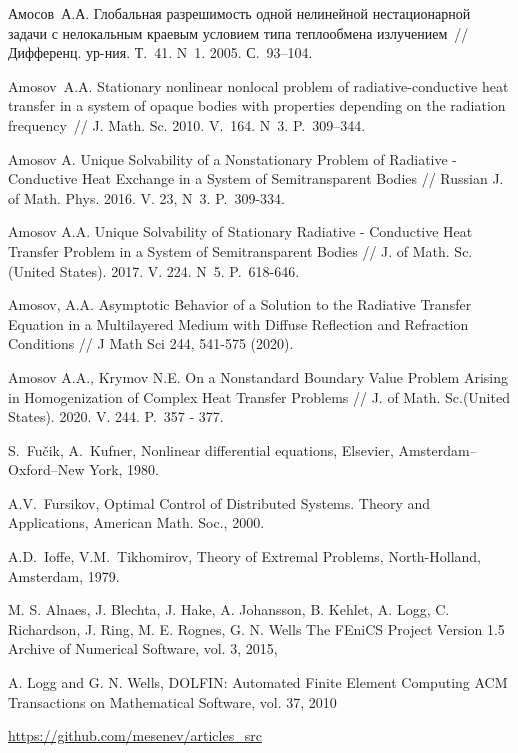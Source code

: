 \documentclass[12pt]{article}
\begin{document}
\begin{thebibliography}{999}
        Амосов~А.А. Глобальная разрешимость одной нелинейной
        нестационарной задачи с нелокальным краевым условием типа
        теплообмена излучением~// Дифференц. ур-ния. Т.~41. N~1.
        2005. С.~93--104.

        Amosov~A.A. Stationary nonlinear nonlocal problem of
        radiative-conductive heat transfer in a system of opaque bodies
        with properties depending on the radiation frequency~// J\@.
        Math. Sc. 2010. V.~164. N~3. P.~309--344.

        Amosov A. Unique Solvability of a Nonstationary Problem of Radiative - Conductive
        Heat Exchange in a System of Semitransparent Bodies // Russian J. of Math.
        Phys. 2016. V. 23, N~3. P.~309-334.

        Amosov A.A. Unique Solvability of Stationary Radiative - Conductive Heat Transfer
        Problem in a System of Semitransparent Bodies // J. of Math. Sc.(United
        States). 2017. V. 224. N~5. P.~618-646.

        Amosov, A.A. Asymptotic Behavior of a Solution to the Radiative Transfer Equation in a Multilayered Medium with Diffuse Reflection and Refraction Conditions // J Math Sci 244, 541-575 (2020).

        Amosov A.A., Krymov N.E. On a Nonstandard Boundary Value Problem Arising in Homogenization of Complex Heat Transfer Problems // J. of Math. Sc.(United
        States). 2020. V. 244. P.~357 - 377.

         S.~Fu\v{c}ik, A.~Kufner, Nonlinear differential equations,
        Elsevier, Amsterdam--Oxford--New York, 1980.

         A.V.~Fursikov, Optimal Control of Distributed
        Systems. Theory and Applications, American Math. Soc., 2000.

         A.D.~Ioffe, V.M.~Tikhomirov, Theory of Extremal
        Problems, North-Holland, Amsterdam, 1979.

         M. S. Alnaes, J. Blechta, J. Hake, A. Johansson,
        B. Kehlet, A. Logg, C. Richardson, J. Ring, M. E. Rognes, G. N. Wells
        The FEniCS Project Version 1.5
        Archive of Numerical Software, vol. 3, 2015,

         A. Logg and G. N. Wells, DOLFIN: Automated Finite Element Computing
        ACM Transactions on Mathematical Software, vol. 37, 2010

         \url{https://github.com/mesenev/articles_src}


    \end{thebibliography}
\end{document}
